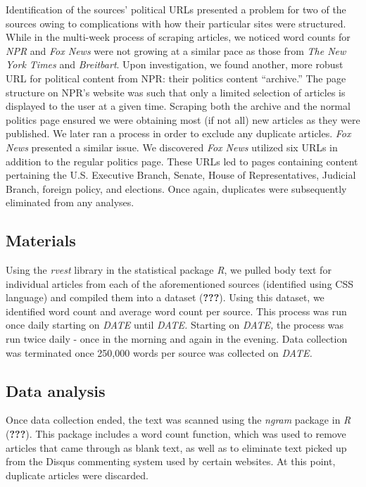 \documentclass[,man]{apa6}
\theoremstyle{definition}
\theoremstyle{definition}
\theoremstyle{definition}
\theoremstyle{remark}
\begin{document}
Identification of the sources' political URLs presented a problem for
two of the sources owing to complications with how their particular
sites were structured. While in the multi-week process of scraping
articles, we noticed word counts for \emph{NPR} and \emph{Fox News} were
not growing at a similar pace as those from \emph{The New York Times}
and \emph{Breitbart}. Upon investigation, we found another, more robust
URL for political content from NPR: their politics content
\enquote{archive.} The page structure on NPR's website was such that
only a limited selection of articles is displayed to the user at a given
time. Scraping both the archive and the normal politics page ensured we
were obtaining most (if not all) new articles as they were published. We
later ran a process in order to exclude any duplicate articles.
\emph{Fox News} presented a similar issue. We discovered \emph{Fox News}
utilized six URLs in addition to the regular politics page. These URLs
led to pages containing content pertaining the U.S. Executive Branch,
Senate, House of Representatives, Judicial Branch, foreign policy, and
elections. Once again, duplicates were subsequently eliminated from any
analyses.

\hypertarget{materials}{%
\subsection{Materials}\label{materials}}

Using the \emph{rvest} library in the statistical package \emph{R}, we
pulled body text for individual articles from each of the aforementioned
sources (identified using CSS language) and compiled them into a dataset
({\textbf{???}}). Using this dataset, we identified word count and
average word count per source. This process was run once daily starting
on \emph{DATE} until \emph{DATE.} Starting on \emph{DATE,} the process
was run twice daily - once in the morning and again in the evening. Data
collection was terminated once 250,000 words per source was collected on
\emph{DATE.}

\hypertarget{data-analysis}{%
\subsection{Data analysis}\label{data-analysis}}

Once data collection ended, the text was scanned using the \emph{ngram}
package in \emph{R} ({\textbf{???}}). This package includes a word count
function, which was used to remove articles that came through as blank
text, as well as to eliminate text picked up from the Disqus commenting
system used by certain websites. At this point, duplicate articles were
discarded.
\end{document}
